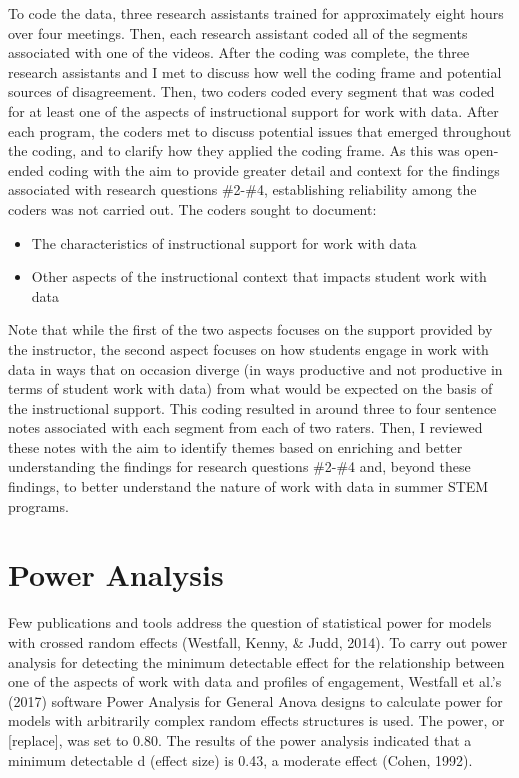 \documentclass[]{msu-thesis}
\providecommand{\tightlist}{%
  \setlength{\itemsep}{0pt}\setlength{\parskip}{0pt}}
\theoremstyle{definition}
\theoremstyle{definition}
\theoremstyle{definition}
\theoremstyle{remark}
\begin{document}
To code the data, three research assistants trained for approximately
eight hours over four meetings. Then, each research assistant coded all
of the segments associated with one of the videos. After the coding was
complete, the three research assistants and I met to discuss how well
the coding frame and potential sources of disagreement. Then, two coders
coded every segment that was coded for at least one of the aspects of
instructional support for work with data. After each program, the coders
met to discuss potential issues that emerged throughout the coding, and
to clarify how they applied the coding frame. As this was open-ended
coding with the aim to provide greater detail and context for the
findings associated with research questions \#2-\#4, establishing
reliability among the coders was not carried out. The coders sought to
document:

\begin{itemize}
\tightlist
\item
  The characteristics of instructional support for work with data
\item
  Other aspects of the instructional context that impacts student work
  with data
\end{itemize}

Note that while the first of the two aspects focuses on the support
provided by the instructor, the second aspect focuses on how students
engage in work with data in ways that on occasion diverge (in ways
productive and not productive in terms of student work with data) from
what would be expected on the basis of the instructional support. This
coding resulted in around three to four sentence notes associated with
each segment from each of two raters. Then, I reviewed these notes with
the aim to identify themes based on enriching and better understanding
the findings for research questions \#2-\#4 and, beyond these findings,
to better understand the nature of work with data in summer STEM
programs.

\section{Power Analysis}\label{power-analysis}

Few publications and tools address the question of statistical power for
models with crossed random effects (Westfall, Kenny, \& Judd, 2014). To
carry out power analysis for detecting the minimum detectable effect for
the relationship between one of the aspects of work with data and
profiles of engagement, Westfall et al.'s (2017) software Power Analysis
for General Anova designs to calculate power for models with arbitrarily
complex random effects structures is used. The power, or {[}replace{]},
was set to 0.80. The results of the power analysis indicated that a
minimum detectable d (effect size) is 0.43, a moderate effect (Cohen,
1992).
\end{document}
